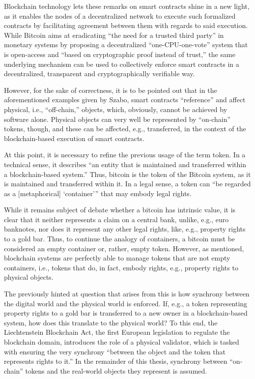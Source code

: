 Blockchain technology lets these remarks on smart contracts shine in a new light, as it enables the nodes of a decentralized network to execute such formalized contracts by facilitating agreement between them with regards to said execution.
While Bitcoin aims at eradicating ``the need for a trusted third party'' in monetary systems by proposing a decentralized ``one-CPU-one-vote'' system that is open-access and ``based on cryptographic proof instead of trust,'' \autocite[1, 3]{nakamoto2008} the same underlying mechanism can be used to collectively enforce smart contracts in a decentralized, transparent and cryptographically verifiable way.

However, for the sake of correctness, it is to be pointed out that in the aforementioned examples given by Szabo, smart contracts ``reference'' \autocite{szabo1997} and affect physical, i.e., ``off-chain,'' objects, which, obviously, cannot be achieved by software alone.
Physical objects can very well be represented by ``on-chain'' tokens, though, and these can be affected, e.g., transferred, in the context of the blockchain-based execution of smart contracts.

At this point, it is necessary to refine the previous usage of the term token.
In a technical sense, it describes ``an entity that is maintained and transferred within a blockchain-based system.'' \autocite[15]{baerenfaenger2020a}
Thus, bitcoin is the token of the Bitcoin system, as it is maintained and transferred within it.
In a legal sense, a token can \enquote{be regarded as a [metaphorical] \enquote{container}} that may embody legal rights. \autocites[15]{baerenfaenger2020a}[55, 57]{li2019}

While it remains subject of debate whether a bitcoin has intrinsic value, it is clear that it neither represents a claim on a central bank, unlike, e.g., euro banknotes, nor does it represent any other legal rights, like, e.g., property rights to a gold bar.
Thus, to continue the analogy of containers, a bitcoin must be considered an empty container or, rather, empty token.
However, as mentioned, blockchain systems are perfectly able to manage tokens that are not empty containers, i.e., tokens that do, in fact, embody rights, e.g., property rights to physical objects.

The previously hinted at question that arises from this is how synchrony between the digital world and the physical world is enforced.
If, e.g., a token representing property rights to a gold bar is transferred to a new owner in a blockchain-based system, how does this translate to the physical world?
To this end, the Liechtenstein Blockchain Act, the first European legislation to regulate the blockchain domain, introduces the role of a physical validator, which is tasked with ensuring the very synchrony ``between the object and the token that represents rights to it.'' \autocite[67]{li2019}
In the remainder of this thesis, synchrony between ``on-chain'' tokens and the real-world objects they represent is assumed.

